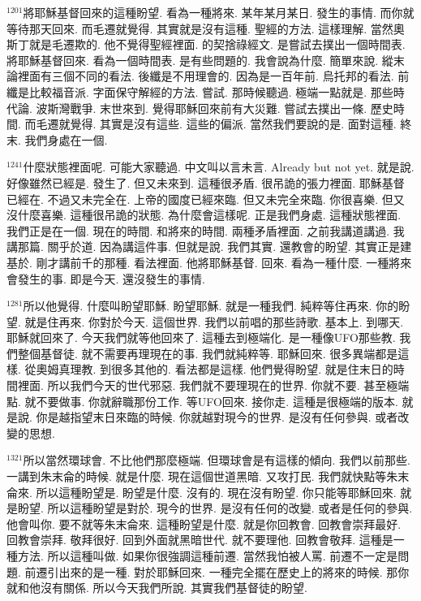 \documentclass{book}
\begin{document}
$^{1201}$將耶穌基督回來的這種盼望.
看為一種將來.
某年某月某日.
發生的事情.
而你就等待那天回來.
而毛遷就覺得.
其實就是沒有這種.
聖經的方法.
這樣理解.
當然奧斯丁就是毛遷欺的.
他不覺得聖經裡面.
的契捨祿經文.
是嘗試去撲出一個時間表.
將耶穌基督回來.
看為一個時間表.
是有些問題的.
我會說為什麼.
簡單來說.
縱末論裡面有三個不同的看法.
後纖是不用理會的.
因為是一百年前.
烏托邦的看法.
前纖是比較福音派.
字面保守解經的方法.
嘗試.
那時候聽過.
極端一點就是.
那些時代論.
波斯灣戰爭.
末世來到.
覺得耶穌回來前有大災難.
嘗試去撲出一條.
歷史時間.
而毛遷就覺得.
其實是沒有這些.
這些的偏派.
當然我們要說的是.
面對這種.
終末.
我們身處在一個.

$^{1241}$什麼狀態裡面呢.
可能大家聽過.
中文叫以言未言.
Already but not yet.
就是說.
好像雖然已經是.
發生了.
但又未來到.
這種很矛盾.
很吊詭的張力裡面.
耶穌基督已經在.
不過又未完全在.
上帝的國度已經來臨.
但又未完全來臨.
你很喜樂.
但又沒什麼喜樂.
這種很吊詭的狀態.
為什麼會這樣呢.
正是我們身處.
這種狀態裡面.
我們正是在一個.
現在的時間.
和將來的時間.
兩種矛盾裡面.
之前我講道講過.
我講那篇.
關乎於道.
因為講這件事.
但就是說.
我們其實.
還教會的盼望.
其實正是建基於.
剛才講前千的那種.
看法裡面.
他將耶穌基督.
回來.
看為一種什麼.
一種將來會發生的事.
即是今天.
還沒發生的事情.

$^{1281}$所以他覺得.
什麼叫盼望耶穌.
盼望耶穌.
就是一種我們.
純粹等住再來.
你的盼望.
就是住再來.
你對於今天.
這個世界.
我們以前唱的那些詩歌.
基本上.
到哪天.
耶穌就回來了.
今天我們就等他回來了.
這種去到極端化.
是一種像UFO那些教.
我們整個基督徒.
就不需要再理現在的事.
我們就純粹等.
耶穌回來.
很多異端都是這樣.
從奧姆真理教.
到很多其他的.
看法都是這樣.
他們覺得盼望.
就是住末日的時間裡面.
所以我們今天的世代邪惡.
我們就不要理現在的世界.
你就不要.
甚至極端點.
就不要做事.
你就辭職那份工作.
等UFO回來.
接你走.
這種是很極端的版本.
就是說.
你是越指望末日來臨的時候.
你就越對現今的世界.
是沒有任何參與.
或者改變的思想.

$^{1321}$所以當然環球會.
不比他們那麼極端.
但環球會是有這樣的傾向.
我們以前那些.
一講到朱末侖的時候.
就是什麼.
現在這個世道黑暗.
又攻打民.
我們就快點等朱末侖來.
所以這種盼望是.
盼望是什麼.
沒有的.
現在沒有盼望.
你只能等耶穌回來.
就是盼望.
所以這種盼望是對於.
現今的世界.
是沒有任何的改變.
或者是任何的參與.
他會叫你.
要不就等朱末侖來.
這種盼望是什麼.
就是你回教會.
回教會崇拜最好.
回教會崇拜.
敬拜很好.
回到外面就黑暗世代.
就不要理他.
回教會敬拜.
這種是一種方法.
所以這種叫做.
如果你很強調這種前遷.
當然我怕被人罵.
前遷不一定是問題.
前遷引出來的是一種.
對於耶穌回來.
一種完全擺在歷史上的將來的時候.
那你就和他沒有關係.
所以今天我們所說.
其實我們基督徒的盼望.
\end{document}
